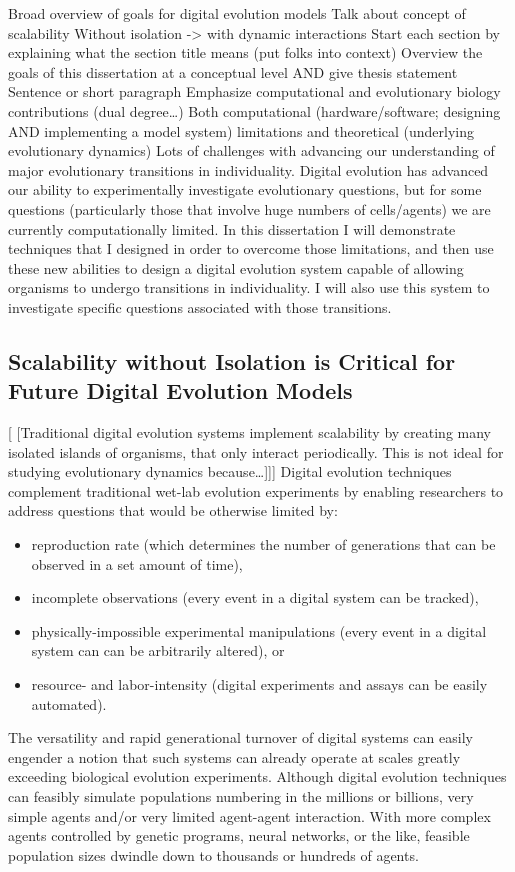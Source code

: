 Broad overview of goals for digital evolution models
Talk about concept of scalability
Without isolation -> with dynamic interactions
Start each section by explaining what the section title means (put folks into context)
Overview the goals of this dissertation at a conceptual level AND give thesis statement
Sentence or short paragraph
Emphasize computational and evolutionary biology contributions (dual degree…)
Both computational (hardware/software; designing AND implementing a model system) limitations and theoretical (underlying evolutionary dynamics)
Lots of challenges with advancing our understanding of major evolutionary transitions in individuality.
Digital evolution has advanced our ability to experimentally investigate evolutionary questions, but for some questions (particularly those that involve huge numbers of cells/agents) we are currently computationally limited.
In this dissertation I will demonstrate techniques that I designed in order to overcome those limitations, and then use these new abilities to design a digital evolution system capable of allowing organisms to undergo transitions in individuality.
I will also use this system to investigate specific questions associated with those transitions.

\subsection{Scalability without Isolation is Critical for Future Digital Evolution Models}
[
[Traditional digital evolution systems implement scalability by creating many isolated islands of organisms, that only interact periodically.
This is not ideal for studying evolutionary dynamics because…]]]
Digital evolution techniques complement traditional wet-lab evolution experiments by enabling researchers to address questions that would be otherwise limited by:
\begin{itemize}
\item reproduction rate (which determines the number of generations that can be observed in a set amount of time),
\item incomplete observations (every event in a digital system can be tracked),
\item physically-impossible experimental manipulations (every event in a digital system can can be arbitrarily altered), or
\item resource- and labor-intensity (digital experiments and assays can be easily automated).
\end{itemize}
The versatility and rapid generational turnover of digital systems can easily engender a notion that such systems can already operate at scales greatly exceeding biological evolution experiments.
Although digital evolution techniques can feasibly simulate populations numbering in the millions or billions, very simple agents and/or very limited agent-agent interaction.
With more complex agents controlled by genetic programs, neural networks, or the like, feasible population sizes dwindle down to thousands or hundreds of agents.

